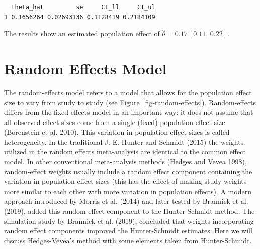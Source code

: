\documentclass[
  letterpaper,
  DIV=11,
  numbers=noendperiod]{scrreprt}
\newenvironment{Shaded}{}{}
\newcommand{\AttributeTok}[1]{\textcolor[rgb]{0.00,0.34,0.68}{#1}}
\newcommand{\CommentTok}[1]{\textcolor[rgb]{0.54,0.53,0.53}{#1}}
\newcommand{\DecValTok}[1]{\textcolor[rgb]{0.69,0.50,0.00}{#1}}
\newcommand{\FunctionTok}[1]{\textcolor[rgb]{0.39,0.29,0.61}{#1}}
\newcommand{\NormalTok}[1]{\textcolor[rgb]{0.12,0.11,0.11}{#1}}
\newcommand{\OtherTok}[1]{\textcolor[rgb]{0.00,0.43,0.16}{#1}}
\newcommand{\SpecialCharTok}[1]{\textcolor[rgb]{0.24,0.68,0.91}{#1}}
\newcommand{\StringTok}[1]{\textcolor[rgb]{0.75,0.01,0.01}{#1}}
\begin{document}
\begin{tcolorbox}
\begin{Shaded}
\end{Shaded}

\begin{verbatim}
  theta_hat         se     CI_ll     CI_ul
1 0.1656264 0.02693136 0.1128419 0.2184109
\end{verbatim}

The results show an estimated population effect of
\(\hat{\theta}=0.17\, [0.11,\, 0.22]\).

\end{tcolorbox}

\hypertarget{random-effects-model}{%
\section{Random Effects Model}\label{random-effects-model}}

The random-effects model refers to a model that allows for the
population effect size to vary from study to study (see
Figure~\ref{fig-random-effects}). Random-effects differs from the fixed
effects model in an important way: it does not assume that all observed
effect sizes come from a single (fixed) population effect size
(Borenstein et al. 2010). This variation in population effect sizes is
called heterogeneity. In the traditional J. E. Hunter and Schmidt (2015)
the weights utilized in the random effects meta-analysis are identical
to the common effect model. In other conventional meta-analysis methods
(Hedges and Vevea 1998), random-effect weights usually include a random
effect component containing the variation in population effect sizes
(this has the effect of making study weights more similar to each other
with more variation in population effects). A modern approach introduced
by Morris et al. (2014) and later tested by Brannick et al. (2019),
added this random effect component to the Hunter-Schmidt method. The
simulation study by Brannick et al. (2019), concluded that weights
incorporating random effect components improved the Hunter-Schmidt
estimates. Here we will discuss Hedges-Vevea's method with some elements
taken from Hunter-Schmidt.
\end{document}
